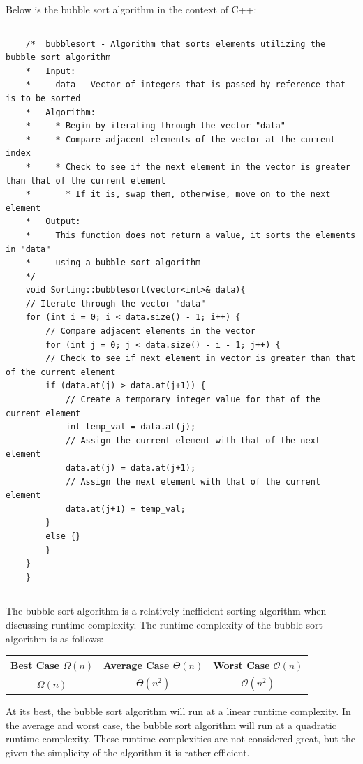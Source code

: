 \documentclass[a4paper,9pt]{article}
\newcommand{\horizontalline}{\noindent \rule{\textwidth}{0.5pt}\par}
\begin{document}
\begin{highlight}

Below is the bubble sort algorithm in the context of C++:

    \horizontalline

    \begin{verbatim}
    /*  bubblesort - Algorithm that sorts elements utilizing the bubble sort algorithm
    *   Input:
    *     data - Vector of integers that is passed by reference that is to be sorted
    *   Algorithm:
    *     * Begin by iterating through the vector "data"
    *     * Compare adjacent elements of the vector at the current index
    *     * Check to see if the next element in the vector is greater than that of the current element
    *       * If it is, swap them, otherwise, move on to the next element
    *   Output:
    *     This function does not return a value, it sorts the elements in "data" 
    *     using a bubble sort algorithm
    */
    void Sorting::bubblesort(vector<int>& data){
    // Iterate through the vector "data"
    for (int i = 0; i < data.size() - 1; i++) {
        // Compare adjacent elements in the vector
        for (int j = 0; j < data.size() - i - 1; j++) {
        // Check to see if next element in vector is greater than that of the current element
        if (data.at(j) > data.at(j+1)) {
            // Create a temporary integer value for that of the current element
            int temp_val = data.at(j);
            // Assign the current element with that of the next element
            data.at(j) = data.at(j+1);
            // Assign the next element with that of the current element
            data.at(j+1) = temp_val;
        }
        else {}
        }
    }
    }
    \end{verbatim}

    \horizontalline

The bubble sort algorithm is a relatively inefficient sorting algorithm when discussing runtime complexity. The runtime complexity of the bubble sort algorithm is as follows:

\begin{center}
    \begin{tabular}{|c|c|c|}
        \hline \textbf{Best Case $\Omega(n)$} & \textbf{Average Case $\Theta(n)$} & \textbf{Worst Case $\mathcal{O}(n)$} \\ \hline
        $\Omega(n)$ & $\Theta(n^2)$ & $\mathcal{O}(n^2)$ \\ \hline
    \end{tabular}
\end{center}

\noindent At its best, the bubble sort algorithm will run at a linear runtime complexity. In the average and worst case, the bubble sort algorithm will run at a quadratic runtime complexity. These runtime complexities are not considered great, but the given the simplicity of the algorithm it is rather efficient.

\end{highlight}
\end{document}
